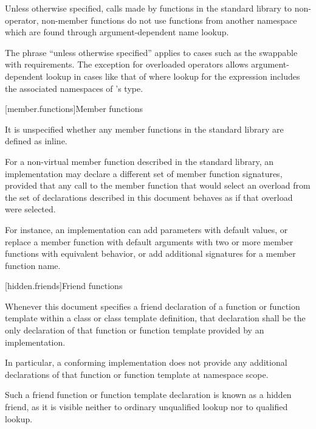\pnum
Unless otherwise specified,
calls made by functions in the standard library to non-operator, non-member functions
do not use functions from another namespace which are found through
argument-dependent name lookup.
\begin{note}
The phrase ``unless otherwise specified'' applies to cases such as
the swappable with requirements.
The exception for overloaded operators allows argument-dependent lookup
in cases like that of
where lookup for the expression 
includes the associated namespaces of 's type.
\end{note}

[member.functions]{Member functions}

\pnum
It is unspecified whether any member functions in the \Cpp{} standard library are defined as
inline.

\pnum
For a non-virtual member function described in the \Cpp{} standard library,
an implementation may declare a different set of member function signatures,
provided that any call to the member function that would select
an overload from the set of declarations described in this document
behaves as if that overload were selected.
\begin{note}
For instance, an implementation can add parameters with default values,
or replace a member function with default arguments
with two or more member functions with equivalent behavior,
or add additional signatures for a member function name.
\end{note}

[hidden.friends]{Friend functions}

\pnum
Whenever this document specifies
a friend declaration of a function or function template
within a class or class template definition,
that declaration shall be
the only declaration of that function or function template
provided by an implementation.
\begin{note}
In particular,
a conforming implementation does not provide
any additional declarations of that function or function template
at namespace scope.
\end{note}
\begin{note}
Such a friend function or function template declaration
is known as a hidden friend,
as it is visible neither
to ordinary unqualified lookup nor
to qualified lookup.
\end{note}

